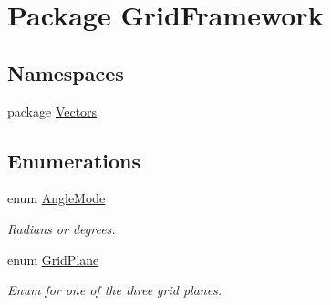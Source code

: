 \hypertarget{namespace_grid_framework}{\section{Package Grid\+Framework}
\label{namespace_grid_framework}
}
\subsection*{Namespaces}
\begin{DoxyCompactItemize}
\item 
package \hyperlink{namespace_grid_framework_1_1_vectors}{Vectors}
\end{DoxyCompactItemize}
\subsection*{Enumerations}
\begin{DoxyCompactItemize}
\item 
enum \hyperlink{namespace_grid_framework_af11322a36c09698c9ad2fa65f85320a9_af11322a36c09698c9ad2fa65f85320a9}{Angle\+Mode} 
\begin{DoxyCompactList}\small\item\em Radians or degrees.\end{DoxyCompactList}\item 
enum \hyperlink{namespace_grid_framework_aa55de93079e09bd55c4cb660025820d5_aa55de93079e09bd55c4cb660025820d5}{Grid\+Plane} 
\begin{DoxyCompactList}\small\item\em Enum for one of the three grid planes.\end{DoxyCompactList}\end{DoxyCompactItemize}


